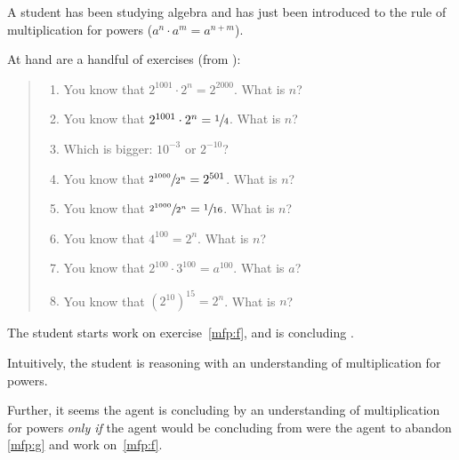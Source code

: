 \begin{note}
  \begin{scenario}%
    \label{illu:tR:powers}%
    A student has been studying algebra and has just been introduced to the rule of multiplication for powers (\(a^{n} \cdot a^{m} = a^{n + m}\)).

    At hand are a handful of exercises (from \cite[32]{Gelfand:1993aa}):
    \begin{quote}
      \begin{enumerate}[label=(\alph*), ref=(\alph*)]
      \item
        \label{mfp:a}
        You know that \(2^{1001} \cdot 2^{n} = 2^{2000}\).
        What is \(n\)?
      \item
        \label{mfp:b}
        You know that \(2^{1001} \cdot 2^{n} = \sfrac{1}{4}\).
        What is \(n\)?
      \item
        \label{mfp:c}
        Which is bigger: \(10^{-3}\) or \(2^{-10}\)?
      \item
        \label{mfp:d}
        You know that \(\sfrac{2^{1000}}{2^{n}} = 2^{501}\).
        What is \(n\)?
      \item
        \label{mfp:e}
        You know that \(\sfrac{2^{1000}}{2^{n}} = \sfrac{1}{16}\).
        What is \(n\)?
      \item
        \label{mfp:f}
        You know that \(4^{100} = 2^{n}\).
        What is \(n\)?
      \item
        \label{mfp:g}
        You know that \(2^{100} \cdot 3^{100} = a^{100}\).
        What is \(a\)?
      \item
        \label{mfp:h}
        You know that \((2^{10})^{15} = 2^{n}\).
        What is \(n\)?
      \end{enumerate}
    \end{quote}
    The student starts work on exercise~\ref{mfp:f}, and is concluding .
  \end{scenario}

  \noindent%
  Intuitively, the student is reasoning with an understanding of multiplication for powers.

  Further, it seems the agent is concluding  by an understanding of multiplication for powers \emph{only if} the agent would be concluding  from  were the agent to abandon \ref{mfp:g} and work on~\ref{mfp:f}.


\end{note}
